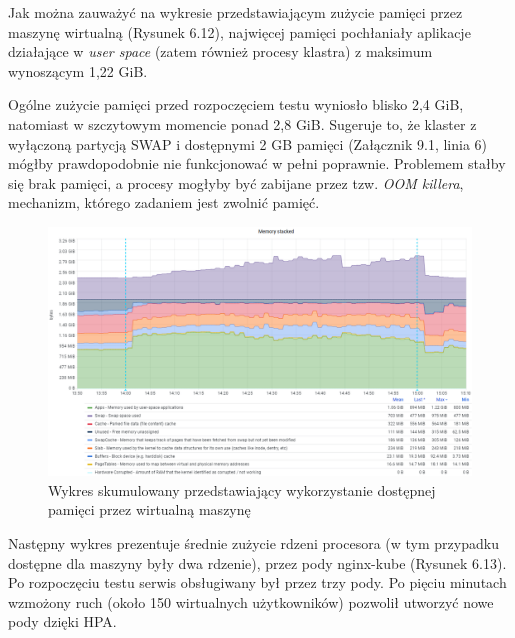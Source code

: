 Jak można zauważyć na wykresie przedstawiającym zużycie pamięci przez maszynę wirtualną (Rysunek 6.12), najwięcej pamięci pochłaniały aplikacje działające w \textit{user space} (zatem również procesy klastra) z maksimum wynoszącym 1,22 GiB. 

Ogólne zużycie pamięci przed rozpoczęciem testu wyniosło blisko 2,4 GiB, natomiast w szczytowym momencie ponad 2,8 GiB. Sugeruje to, że klaster z wyłączoną partycją SWAP i dostępnymi 2 GB pamięci (Załącznik 9.1, linia 6) mógłby prawdopodobnie nie funkcjonować w pełni poprawnie. Problemem stałby się brak pamięci, a procesy mogłyby być zabijane przez tzw. \textit{OOM killera}, mechanizm, którego zadaniem jest zwolnić pamięć. 


\begin{figure}[H]
    \centering
    \includegraphics[width=1\textwidth]{img/test_one/memory.png}
    \caption{Wykres skumulowany przedstawiający wykorzystanie dostępnej pamięci przez wirtualną maszynę}
\end{figure}


Następny wykres prezentuje średnie zużycie rdzeni procesora (w tym przypadku dostępne dla maszyny były dwa rdzenie), przez pody nginx-kube (Rysunek 6.13). Po rozpoczęciu testu serwis obsługiwany był przez trzy pody. Po pięciu minutach wzmożony ruch (około 150 wirtualnych użytkowników) pozwolił utworzyć nowe pody dzięki HPA. 

